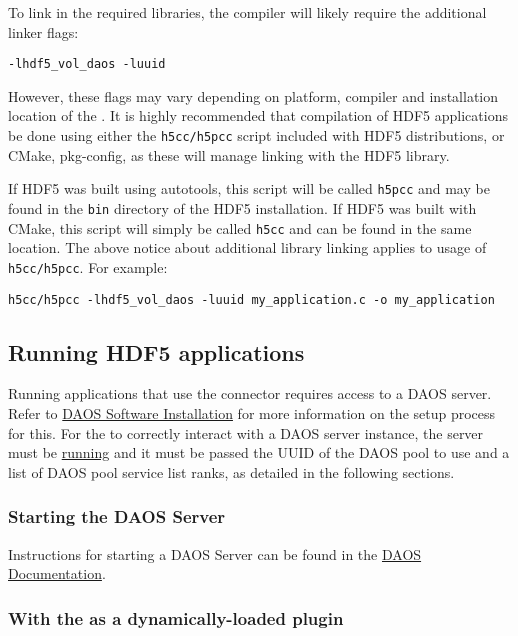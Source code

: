 \documentclass[../users_guide.tex]{subfiles}
\begin{document}
To link in the required libraries, the compiler will likely require the
additional linker flags:

\begin{verbatim}
-lhdf5_vol_daos -luuid
\end{verbatim}

However, these flags may vary depending on platform, compiler and installation
location of the \dvc{}. It is highly recommended that compilation
of HDF5 \dvc{} applications be done using either the
\texttt{h5cc/h5pcc} script included with HDF5 distributions, or CMake,
pkg-config, as these will manage linking with the HDF5 library.

If HDF5 was built using autotools, this script will be called \texttt{h5pcc} and
may be found in the \texttt{bin} directory of the HDF5 installation. If HDF5
was built with CMake, this script will simply be called \texttt{h5cc} and can
be found in the same location. The above notice about additional library
linking applies to usage of \texttt{h5cc/h5pcc}. For example:
\begin{verbatim}
h5cc/h5pcc -lhdf5_vol_daos -luuid my_application.c -o my_application
\end{verbatim}

\subsection{Running HDF5 \dvc{} applications}
\label{running_daos_vol_apps}

Running applications that use the \dvc{} connector requires access to a DAOS
server. Refer to
\href{https://daos-stack.github.io/admin/installation/}{DAOS Software Installation}
for more information on the setup process for this. For the \dvc{}
to correctly interact with a DAOS server instance, the server must be \hyperref[sec:daos_serv_start]{running} and it must be passed the UUID of the
DAOS pool to use and a list of DAOS pool service list ranks, as detailed in the
following sections.

\subsubsection{Starting the DAOS Server}
\label{sec:daos_serv_start}

Instructions for starting a DAOS Server can be found in the \href{https://daos-stack.github.io/admin/deployment/#server-startup}{DAOS Documentation}.

\subsubsection{With the \dvc{} as a dynamically-loaded plugin}
\end{document}
